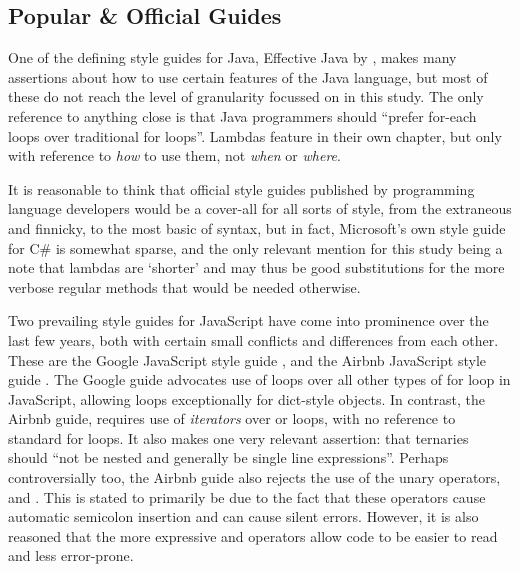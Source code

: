 \documentclass{article}
\begin{document}
    \subsection{Popular \& Official Guides}
        One of the defining style guides for Java, Effective Java by \cite{effectiveJava}, makes many assertions about how to use certain features of the Java language, but most of these do not reach the level of granularity focussed on in this study. The only reference to anything close is that Java programmers should ``prefer for-each loops over traditional for loops''. Lambdas feature in their own chapter, but only with reference to \emph{how} to use them, not \emph{when} or \emph{where}.

        It is reasonable to think that official style guides published by programming language developers would be a cover-all for all sorts of style, from the extraneous and finnicky, to the most basic of syntax, but in fact, Microsoft's own style guide for C\# \citep{microsoftCSStyle} is somewhat sparse, and the only relevant mention for this study being a note that lambdas are `shorter' and may thus be good substitutions for the more verbose regular methods that would be needed otherwise.

        Two prevailing style guides for JavaScript have come into prominence over the last few years, both with certain small conflicts and differences from each other. These are the Google JavaScript style guide \citep{googleJSStyle}, and the Airbnb JavaScript style guide \citep{airbnbJSStyle}. The Google guide advocates use of  loops over all other types of for loop in JavaScript, allowing  loops exceptionally for dict-style objects. In contrast, the Airbnb guide, requires use of \emph{iterators} over  or  loops, with no reference to standard for loops. It also makes one very relevant assertion: that ternaries should ``not be nested and generally be single line expressions''. Perhaps controversially too, the Airbnb guide also rejects the use of the unary operators, \codeword{++} and \codeword{--}. This is stated to primarily be due to the fact that these operators cause automatic semicolon insertion and can cause silent errors. However, it is also reasoned that the more expressive \codeword{+=} and \codeword{-=} operators allow code to be easier to read and less error-prone.
\end{document}

